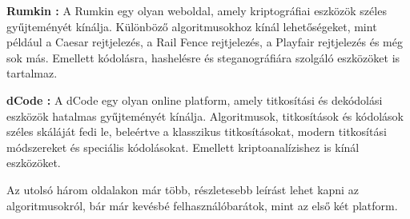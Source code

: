 \textbf{Rumkin \cite{Rum}:} A Rumkin egy olyan weboldal, amely kriptográfiai eszközök széles gyűjteményét kínálja. Különböző algoritmusokhoz kínál lehetőségeket, mint például a Caesar rejtjelezés, a Rail Fence rejtjelezés, a Playfair rejtjelezés és még sok más. Emellett kódolásra, hashelésre és steganográfiára szolgáló eszközöket is tartalmaz.

\textbf{dCode \cite{dCo}:} A dCode egy olyan online platform, amely titkosítási és dekódolási eszközök hatalmas gyűjteményét kínálja. Algoritmusok, titkosítások és kódolások széles skáláját fedi le, beleértve a klasszikus titkosításokat, modern titkosítási módszereket és speciális kódolásokat. Emellett kriptoanalízishez is kínál eszközöket.

Az utolsó három oldalakon már több, részletesebb leírást lehet kapni az algoritmusokról, bár már kevésbé felhasználóbarátok, mint az első két platform.


